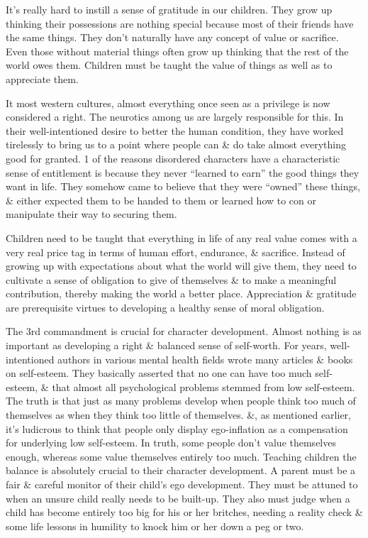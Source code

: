 \documentclass{article}
\numberwithin{equation}{section}
\begin{document}
It's really hard to instill a sense of gratitude in our children. They grow up thinking their possessions are nothing special because most of their friends have the same things. They don't naturally have any concept of value or sacrifice. Even those without material things often grow up thinking that the rest of the world owes them. Children must be taught the value of things as well as to appreciate them.

It most western cultures, almost everything once seen as a privilege is now considered a right. The neurotics among us are largely responsible for this. In their well-intentioned desire to better the human condition, they have worked tirelessly to bring us to a point where people can \& do take almost everything good for granted. 1 of the reasons disordered characters have a characteristic sense of entitlement is because they never ``learned to earn'' the good things they want in life. They somehow came to believe that they were ``owned'' these things, \& either expected them to be handed to them or learned how to con or manipulate their way to securing them.

Children need to be taught that everything in life of any real value comes with a very real price tag in terms of human effort, endurance, \& sacrifice. Instead of growing up with expectations about what the world will give them, they need to cultivate a sense of obligation to give of themselves \& to make a meaningful contribution, thereby making the world a better place. Appreciation \& gratitude are prerequisite virtues to developing a healthy sense of moral obligation.

The 3rd commandment is crucial for character development. Almost nothing is as important as developing a right \& balanced sense of self-worth. For years, well-intentioned authors in various mental health fields wrote many articles \& books on self-esteem. They basically asserted that no one can have too much self-esteem, \& that almost all psychological problems stemmed from low self-esteem. The truth is that just as many problems develop when people think too much of themselves as when they think too little of themselves. \&, as mentioned earlier, it's ludicrous to think that people only display ego-inflation as a compensation for underlying low self-esteem. In truth, some people don't value themselves enough, whereas some value themselves entirely too much. Teaching children the balance is absolutely crucial to their character development. A parent must be a fair \& careful monitor of their child's ego development. They must be attuned to when an unsure child really needs to be built-up. They also must judge when a child has become entirely too big for his or her britches, needing a reality check \& some life lessons in humility to knock him or her down a peg or two.
\end{document}
